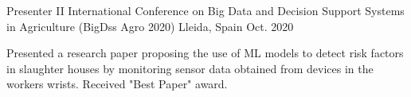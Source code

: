 

\begin{cventries}

  \cventry
    {Presenter} %
      {II International Conference on Big Data and Decision Support Systems in Agriculture (BigDss Agro 2020) } %
    {Lleida, Spain} %
    {Oct. 2020} %
    {
      \begin{cvitems} %
        \item {Presented a research paper proposing the use of ML models to detect risk factors in slaughter houses by monitoring sensor data obtained from devices in the workers wrists. Received "Best Paper" award.}
      \end{cvitems}
    }

\end{cventries}

